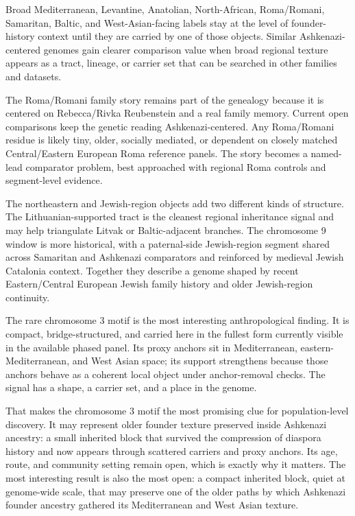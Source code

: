 \documentclass[11pt]{article}
\begin{document}
Broad Mediterranean, Levantine, Anatolian, North-African, Roma/Romani, Samaritan, Baltic, and West-Asian-facing labels stay at the level of founder-history context until they are carried by one of those objects. Similar Ashkenazi-centered genomes gain clearer comparison value when broad regional texture appears as a tract, lineage, or carrier set that can be searched in other families and datasets.

The Roma/Romani family story remains part of the genealogy because it is centered on Rebecca/Rivka Reubenstein and a real family memory. Current open comparisons keep the genetic reading Ashkenazi-centered. Any Roma/Romani residue is likely tiny, older, socially mediated, or dependent on closely matched Central/Eastern European Roma reference panels. The story becomes a named-lead comparator problem, best approached with regional Roma controls and segment-level evidence.

The northeastern and Jewish-region objects add two different kinds of structure. The Lithuanian-supported tract is the cleanest regional inheritance signal and may help triangulate Litvak or Baltic-adjacent branches. The chromosome 9 window is more historical, with a paternal-side Jewish-region segment shared across Samaritan and Ashkenazi comparators and reinforced by medieval Jewish Catalonia context. Together they describe a genome shaped by recent Eastern/Central European Jewish family history and older Jewish-region continuity.

The rare chromosome 3 motif is the most interesting anthropological finding. It is compact, bridge-structured, and carried here in the fullest form currently visible in the available phased panel. Its proxy anchors sit in Mediterranean, eastern-Mediterranean, and West Asian space; its support strengthens because those anchors behave as a coherent local object under anchor-removal checks. The signal has a shape, a carrier set, and a place in the genome.

That makes the chromosome 3 motif the most promising clue for population-level discovery. It may represent older founder texture preserved inside Ashkenazi ancestry: a small inherited block that survived the compression of diaspora history and now appears through scattered carriers and proxy anchors. Its age, route, and community setting remain open, which is exactly why it matters. The most interesting result is also the most open: a compact inherited block, quiet at genome-wide scale, that may preserve one of the older paths by which Ashkenazi founder ancestry gathered its Mediterranean and West Asian texture.
\end{document}
